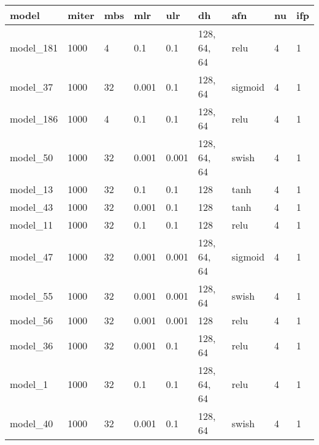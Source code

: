 \begin{tabular}{|l|l|l|l|l|l|l|l|l|}
\hline
\textbf{model} & \textbf{miter} & \textbf{mbs} & \textbf{mlr} & \textbf{ulr} & \textbf{dh} & \textbf{afn} & \textbf{nu} & \textbf{ifp} \\ \hline
model\_181     & 1000           & 4            & 0.1          & 0.1          & 128, 64, 64 & relu         & 4           & 1            \\ \hline
model\_37      & 1000           & 32           & 0.001        & 0.1          & 128, 64     & sigmoid      & 4           & 1            \\ \hline
model\_186     & 1000           & 4            & 0.1          & 0.1          & 128, 64     & relu         & 4           & 1            \\ \hline
model\_50      & 1000           & 32           & 0.001        & 0.001        & 128, 64, 64 & swish        & 4           & 1            \\ \hline
model\_13      & 1000           & 32           & 0.1          & 0.1          & 128         & tanh         & 4           & 1            \\ \hline
model\_43      & 1000           & 32           & 0.001        & 0.1          & 128         & tanh         & 4           & 1            \\ \hline
model\_11      & 1000           & 32           & 0.1          & 0.1          & 128         & relu         & 4           & 1            \\ \hline
model\_47      & 1000           & 32           & 0.001        & 0.001        & 128, 64, 64 & sigmoid      & 4           & 1            \\ \hline
model\_55      & 1000           & 32           & 0.001        & 0.001        & 128, 64     & swish        & 4           & 1            \\ \hline
model\_56      & 1000           & 32           & 0.001        & 0.001        & 128         & relu         & 4           & 1            \\ \hline
model\_36      & 1000           & 32           & 0.001        & 0.1          & 128, 64     & relu         & 4           & 1            \\ \hline
model\_1       & 1000           & 32           & 0.1          & 0.1          & 128, 64, 64 & relu         & 4           & 1            \\ \hline
model\_40      & 1000           & 32           & 0.001        & 0.1          & 128, 64     & swish        & 4           & 1            \\ \hline

\end{tabular}
